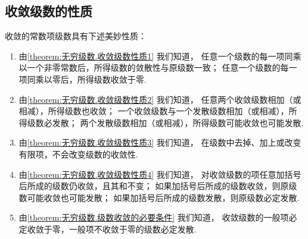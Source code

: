 \subsection*{收敛级数的性质}
收敛的常数项级数具有下述美妙性质：
\begin{enumerate}
	\item 由\cref{theorem:无穷级数.收敛级数性质1} 我们知道，
	任意一个级数的每一项同乘以一个非零常数后，所得级数的敛散性与原级数一致；
	任意一个级数的每一项同乘以零后，所得级数收敛于零.

	\item 由\cref{theorem:无穷级数.收敛级数性质2} 我们知道，
	任意两个收敛级数相加（或相减），所得级数也收敛；
	一个收敛级数与一个发散级数相加（或相减），所得级数必发散；
	两个发散级数相加（或相减），所得级数可能收敛也可能发散.

	\item 由\cref{theorem:无穷级数.收敛级数性质3} 我们知道，
	在级数中去掉、加上或改变有限项，不会改变级数的收敛性.

	\item 由\cref{theorem:无穷级数.收敛级数性质4} 我们知道，
	对收敛级数的项任意加括号后所成的级数仍收敛，且其和不变；
	如果加括号后所成的级数收敛，则原级数可能收敛也可能发散；
	如果加括号后所成的级数发散，则原级数必定发散.

	\item 由\cref{theorem:无穷级数.级数收敛的必要条件} 我们知道，
	收敛级数的一般项必定收敛于零，一般项不收敛于零的级数必定发散.
\end{enumerate}

